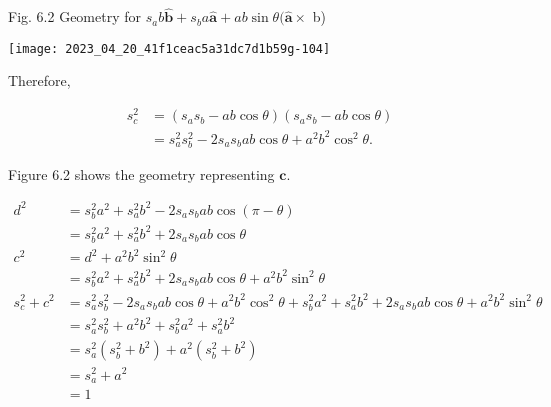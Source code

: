 Fig. 6.2 Geometry for $s_{a} b \hat{\mathbf{b}}+s_{b} a \hat{\mathbf{a}}+a b \sin \theta(\hat{\mathbf{a}} \times$ b)

\begin{center}
    \texttt{[image: 2023\_04\_20\_41f1ceac5a31dc7d1b59g-104]}
\end{center}

Therefore,

$$
    \begin{aligned}
        s_{c}^{2} & =\left(s_{a} s_{b}-a b \cos \theta\right)\left(s_{a} s_{b}-a b \cos \theta\right) \\
                  & =s_{a}^{2} s_{b}^{2}-2 s_{a} s_{b} a b \cos \theta+a^{2} b^{2} \cos ^{2} \theta .
    \end{aligned}
$$

Figure 6.2 shows the geometry representing $\mathbf{c}$.

$$
    \begin{aligned}
        d^{2}           & =s_{b}^{2} a^{2}+s_{a}^{2} b^{2}-2 s_{a} s_{b} a b \cos (\pi-\theta)                                                                                                       \\
                        & =s_{b}^{2} a^{2}+s_{a}^{2} b^{2}+2 s_{a} s_{b} a b \cos \theta                                                                                                             \\
        c^{2}           & =d^{2}+a^{2} b^{2} \sin ^{2} \theta                                                                                                                                        \\
                        & =s_{b}^{2} a^{2}+s_{a}^{2} b^{2}+2 s_{a} s_{b} a b \cos \theta+a^{2} b^{2} \sin ^{2} \theta                                                                                \\
        s_{c}^{2}+c^{2} & =s_{a}^{2} s_{b}^{2}-2 s_{a} s_{b} a b \cos \theta+a^{2} b^{2} \cos ^{2} \theta+s_{b}^{2} a^{2}+s_{a}^{2} b^{2}+2 s_{a} s_{b} a b \cos \theta+a^{2} b^{2} \sin ^{2} \theta \\
                        & =s_{a}^{2} s_{b}^{2}+a^{2} b^{2}+s_{b}^{2} a^{2}+s_{a}^{2} b^{2}                                                                                                           \\
                        & =s_{a}^{2}\left(s_{b}^{2}+b^{2}\right)+a^{2}\left(s_{b}^{2}+b^{2}\right)                                                                                                   \\
                        & =s_{a}^{2}+a^{2}                                                                                                                                                           \\
                        & =1
    \end{aligned}
$$

